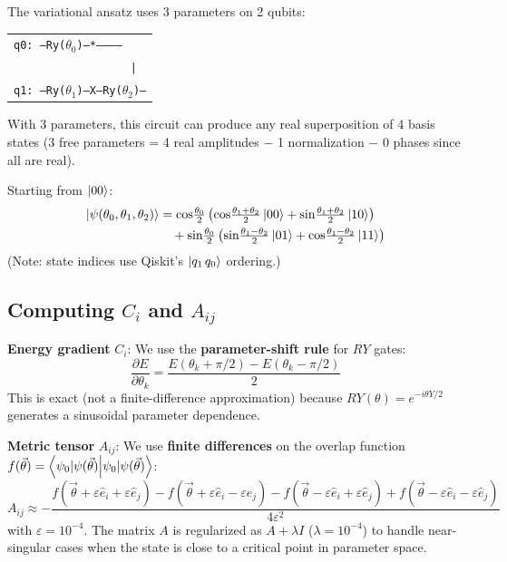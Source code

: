 \documentclass[11pt,a4paper]{article}
\begin{document}
The variational ansatz uses 3 parameters on 2 qubits:
\begin{center}
\begin{tabular}{l}
\texttt{q0: --Ry($\theta_0$)--*-----------} \\
\texttt{~~~~~~~~~~~~~~~~~~|} \\
\texttt{q1: --Ry($\theta_1$)--X--Ry($\theta_2$)--}
\end{tabular}
\end{center}

With 3 parameters, this circuit can produce any real superposition of 4 basis states (3 free parameters = 4 real amplitudes $-$ 1 normalization $-$ 0 phases since all are real).

Starting from $\ket{00}$:
\begin{align}
  \ket{\psi(\theta_0,\theta_1,\theta_2)} &= \cos\!\tfrac{\theta_0}{2}\left(\cos\!\tfrac{\theta_1+\theta_2}{2}\ket{00} + \sin\!\tfrac{\theta_1+\theta_2}{2}\ket{10}\right) \nonumber\\
    &\quad + \sin\!\tfrac{\theta_0}{2}\left(\sin\!\tfrac{\theta_1-\theta_2}{2}\ket{01} + \cos\!\tfrac{\theta_1-\theta_2}{2}\ket{11}\right)
\end{align}
(Note: state indices use Qiskit's $\ket{q_1\,q_0}$ ordering.)

\subsection{Computing $C_i$ and $A_{ij}$}

\textbf{Energy gradient} $C_i$: We use the \textbf{parameter-shift rule} for $RY$ gates:
\begin{equation}
  \frac{\partial E}{\partial \theta_k} = \frac{E(\theta_k + \pi/2) - E(\theta_k - \pi/2)}{2}
\end{equation}
This is exact (not a finite-difference approximation) because $RY(\theta) = e^{-i\theta Y/2}$ generates a sinusoidal parameter dependence.

\textbf{Metric tensor} $A_{ij}$: We use \textbf{finite differences} on the overlap function $f(\vec{\theta}) = \braket{\psi_0|\psi(\vec{\theta})}$:
\begin{equation}
  A_{ij} \approx -\frac{f(\vec{\theta}+\varepsilon\hat{e}_i+\varepsilon\hat{e}_j) - f(\vec{\theta}+\varepsilon\hat{e}_i-\varepsilon\hat{e}_j) - f(\vec{\theta}-\varepsilon\hat{e}_i+\varepsilon\hat{e}_j) + f(\vec{\theta}-\varepsilon\hat{e}_i-\varepsilon\hat{e}_j)}{4\varepsilon^2}
\end{equation}
with $\varepsilon = 10^{-4}$. The matrix $A$ is regularized as $A + \lambda I$ ($\lambda = 10^{-4}$) to handle near-singular cases when the state is close to a critical point in parameter space.
\end{document}
